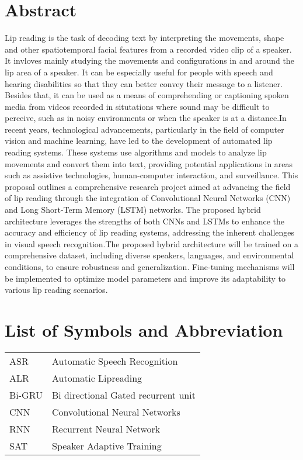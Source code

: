 		\large
			\chapter*{Abstract}
		\normalsize
		
		Lip reading is the task of decoding text by interpreting the movements, shape and other spatiotemporal facial features from  a recorded video clip of a speaker. It invloves mainly studying the movements and configurations in and around the lip area of a speaker. It can be especially useful for people with speech and hearing disabilities so that they can better convey their message to a listener. Besides that, it can be used as a means of comprehending or captioning spoken media from videos recorded in situtations where sound may be difficult to perceive, such as in noisy environments or when the speaker is at a distance.In recent years, technological advancements, particularly in the field of computer vision and machine learning, have led to the development of automated lip reading systems. These systems use algorithms and models to analyze lip movements and convert them into text, providing potential applications in areas such as assistive technologies, human-computer interaction, and surveillance. This proposal outlines a comprehensive research project aimed at advancing the field of lip reading through the integration of Convolutional Neural Networks (CNN) and Long Short-Term Memory (LSTM) networks. The proposed hybrid architecture leverages the strengths of both CNNs and LSTMs to enhance the accuracy and efficiency of lip reading systems, addressing the inherent challenges in visual speech recognition.The proposed hybrid architecture will be trained on a comprehensive dataset, including diverse speakers, languages, and environmental conditions, to ensure robustness and generalization. Fine-tuning mechanisms will be implemented to optimize model parameters and improve its adaptability to various lip reading scenarios.
		
		\break
		
		
	\tableofcontents
		
	\break
	
	\listoffigures
	\break
	\pagebreak
	
	
		\Large
			\begingroup
				\let\clearpage\relax
				\chapter*{List of Symbols and Abbreviation}
			\endgroup
		\normalsize
		\begin{tabular}{p{1in}p{3in}}
			ASR & Automatic Speech Recognition\\
			ALR & Automatic Lipreading\\
			Bi-GRU & Bi directional Gated recurrent unit\\
			CNN & Convolutional Neural Networks\\
			RNN & Recurrent Neural Network\\
			SAT & Speaker Adaptive Training
		\end{tabular}
		\break
		\pagebreak